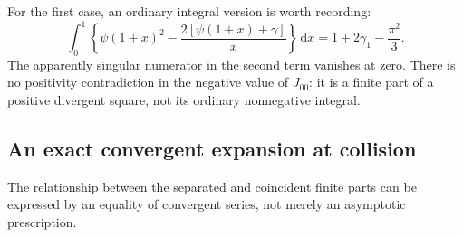 \documentclass[11pt]{article}
\numberwithin{equation}{section}
\theoremstyle{definition}
\theoremstyle{remark}
\newcommand{\dd}{\,\mathrm d}
\begin{document}
For the first case, an ordinary integral version is worth recording:
\begin{equation}
 \int_0^1\left\{\psi(1+x)^2
       -\frac{2[\psi(1+x)+\gamma]}x\right\}\dd x
 =1+2\gamma_1-\frac{\pi^2}{3}.
 \label{eq:digamma-square-convergent}
\end{equation}
The apparently singular numerator in the second term vanishes at zero.
There is no positivity contradiction in the negative value of $J_{00}$:
it is a finite part of a positive divergent square, not its ordinary
nonnegative integral.

\subsection{An exact convergent expansion at collision}
The relationship between the separated and coincident finite parts can
be expressed by an equality of convergent series, not merely an
asymptotic prescription.
\end{document}
